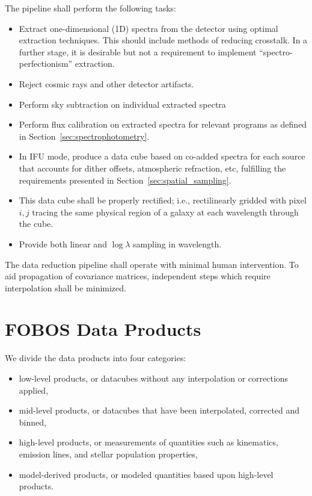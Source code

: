 \documentclass[preprint,11pt]{aastex}
\begin{document}
The pipeline shall perform the following tasks:
\begin{itemize}
\item Extract one-dimensional (1D) spectra from the detector using
  optimal extraction techniques. This should include methods of
  reducing crosstalk. In a further stage, it is desirable but not a
  requirement to implement ``spectro-perfectionism'' extraction.
\item Reject cosmic rays and other detector artifacts.
\item Perform sky subtraction on individual extracted spectra
\item Perform flux calibration on extracted spectra for relevant programs as
   defined in Section~\ref{sec:spectrophotometry}.
\item In IFU mode, produce a data cube based on co-added spectra for each source
  that accounts for dither offsets, atmospheric refraction, etc,
  fulfilling the requirements presented in
  Section~\ref{sec:spatial_sampling}.
\item This data cube shall be properly rectified; i.e., rectilinearly
  gridded with pixel $i,j$ tracing the same physical region of a galaxy
  at each wavelength through the cube.
\item Provide both linear and $\log \lambda$ sampling in wavelength.
\end{itemize}

\medskip
\noindent The data reduction pipeline shall operate with minimal human
intervention.  To aid propagation of covariance matrices, independent
steps which require interpolation shall be minimized.


\section{FOBOS Data Products} \label{sec:data_products}

We divide the data products into four categories:

\begin{itemize}
\item low-level products, or datacubes without any
  interpolation or corrections applied,
\item mid-level products, or datacubes that have been interpolated,
  corrected and binned,
\item high-level products, or measurements of quantities such as
  kinematics, emission lines, and stellar population properties,
\item model-derived products, or modeled quantities based upon
  high-level products.
\end{itemize}
\end{document}
